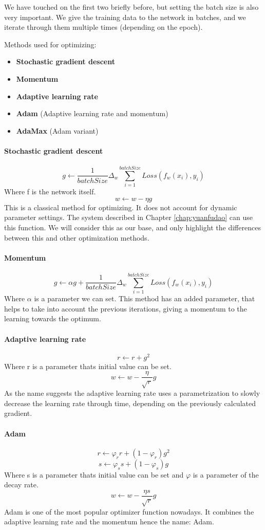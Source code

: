 We have touched on the first two briefly before, but setting the batch size is also very important. We give the training data to the network in batches, and we iterate through them multiple times (depending on the epoch).

Methods used for optimizing:
\begin{itemize}
	\item \textbf{Stochastic gradient descent}
	\item \textbf{Momentum}
	\item \textbf{Adaptive learning rate}
	\item \textbf{Adam} (Adaptive learning rate and momentum)
	\item \textbf{AdaMax} (Adam variant)
\end{itemize}

\paragraph*{Stochastic gradient descent}
\[g \leftarrow \frac{1}{batchSize}\Delta_w \sum_{i=1}^{batchSize}Loss(f_w(x_i), y_i)\]
Where f is the network itself.
\[w \leftarrow w - \eta g\]
This is a classical method for optimizing. It does not account for dynamic parameter settings. The system described in Chapter \ref{chap:yuanfudao} can use this function.
We will consider this as our base, and only highlight the differences between this and other optimization methods.

\paragraph*{Momentum}
\[g \leftarrow \alpha g + \frac{1}{batchSize}\Delta_w \sum_{i=1}^{batchSize}Loss(f_w(x_i), y_i)\]
Where \(\alpha\) is a parameter we can set.
This method has an added parameter, that helps to take into account the previous iterations, giving a momentum to the learning towards the optimum.

\paragraph*{Adaptive learning rate}
\[r \leftarrow r + g^2\]
Where r is a parameter thats initial value can be set.
\[w \leftarrow w - \frac{\eta}{\sqrt{r}} g\]
As the name suggests the adaptive learning rate uses a parametrization to slowly decrease the learning rate through time, depending on the previously calculated gradient.

\paragraph*{Adam}
\[r \leftarrow \varphi_r r + (1 - \varphi_r) g^2\]
\[s \leftarrow \varphi_s s + (1 - \varphi_s) g\]
Where s is a parameter thats initial value can be set and \(\varphi\) is a parameter of the decay rate.
\[w \leftarrow w - \frac{\eta s}{\sqrt{r}} g\]
Adam is one of the most popular optimizer function nowadays. It combines the adaptive learning rate and the momentum hence the name: Adam.

